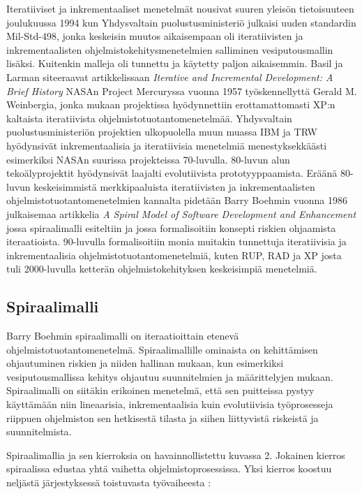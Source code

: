 \documentclass[finnish,12pt]{tktltiki2}
\theoremstyle{definition}
\theoremstyle{remark}
\begin{document}
Iteratiiviset ja inkrementaaliset menetelmät nousivat suuren yleisön tietoisuuteen joulukuussa 1994 kun Yhdysvaltain puolustusministeriö julkaisi uuden standardin Mil-Std-498, jonka keskeisin muutos aikaisempaan oli iteratiivisten ja inkrementaalisten ohjelmistokehitysmenetelmien salliminen vesiputousmallin lisäksi. Kuitenkin malleja oli tunnettu ja käytetty paljon aikaisemmin. Basil ja Larman siteeraavat artikkelissaan \textit{Iterative and Incremental Development: A Brief History} \cite{larman03} NASAn Project Mercuryssa vuonna 1957 työskennellyttä Gerald M. Weinbergia, jonka mukaan projektissa hyödynnettiin erottamattomasti XP:n kaltaista iteratiivista ohjelmistotuotantomenetelmää. Yhdysvaltain puolustusministeriön projektien ulkopuolella muun muassa IBM ja TRW hyödynsivät inkrementaalisia ja iteratiivisia menetelmiä menestyksekkäästi esimerkiksi NASAn suurissa projekteissa 70-luvulla.\cite{larman03} 80-luvun alun tekoälyprojektit hyödynsivät laajalti evolutiivista prototyyppaamista. Eräänä 80-luvun keskeisimmistä merkkipaaluista iteratiivisten ja inkrementaalisten ohjelmistotuotantomenetelmien kannalta pidetään Barry Boehmin vuonna 1986 julkaisemaa artikkelia \textit{A Spiral Model of Software Development and Enhancement} \cite{Boehm:1988:SMS:45797.45801} jossa spiraalimalli esiteltiin ja jossa formalisoitiin konsepti riskien ohjaamista iteraatioista. 
90-luvulla formalisoitiin monia muitakin tunnettuja iteratiivisia ja inkrementaalisia ohjelmistotuotantomenetelmiä, kuten RUP, RAD ja XP \cite{larman03} josta tuli 2000-luvulla ketterän ohjelmistokehityksen keskeisimpiä menetelmiä.

\subsection{Spiraalimalli}

Barry Boehmin spiraalimalli on iteraatioittain etenevä ohjelmistotuotantomenetelmä. Spiraalimallille ominaista on kehittämisen ohjautuminen riskien ja niiden hallinan mukaan, kun esimerkiksi vesiputousmallissa kehitys ohjautuu suunnitelmien ja määrittelyjen mukaan. Spiraalimalli on siitäkin erikoinen menetelmä, että sen puitteissa pystyy käyttämään niin lineaarisia, inkrementaalisia kuin evolutiivisia työprosesseja riippuen ohjelmiston sen hetkisestä tilasta ja siihen liittyvistä riskeistä ja suunnitelmista. 

Spiraalimallia ja sen kierroksia on havainnollistettu kuvassa 2. Jokainen kierros spiraalissa edustaa yhtä vaihetta ohjelmistoprosessissa. Yksi kierros koostuu neljästä järjestyksessä toistuvasta työvaiheesta \cite{Sommerville10}:
\end{document}
